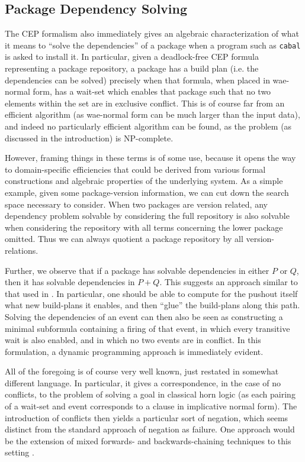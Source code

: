 \documentclass[hoptionsi,review,screen,format=sigconf]{acmart}
\theoremstyle{definition}
\begin{document}
\subsection{Package Dependency Solving}

The CEP formalism also immediately gives an algebraic characterization of what it means to ``solve the dependencies'' of a package when a program such as \texttt{cabal} is asked to install it. In particular, given a deadlock-free CEP formula representing a package repository, a package has a build plan (i.e. the dependencies can be solved) precisely when that formula, when placed in wae-normal form, has a wait-set which enables that package such that no two elements within the set are in exclusive conflict. This is of course far from an efficient algorithm (as wae-normal form can be much larger than the input data), and indeed no particularly efficient algorithm can be found, as the problem (as discussed in the introduction) is NP-complete. 

However, framing things in these terms is of some use, because it opens the way to domain-specific efficiencies that could be derived from various formal constructions and algebraic properties of the underlying system. As a simple example, given some package-version information, we can cut down the search space necessary to consider. When two packages are version related, any dependency problem solvable by considering the full repository is also solvable when considering the repository with all terms concerning the lower package omitted. Thus we can always quotient a package repository by all version-relations. 

Further, we observe that if a package has solvable dependencies in either \(P\) or \(Q\), then it has solvable dependencies in \(P + Q\). This suggests an approach similar to that used in \cite{master2020open}. In particular, one should be able to compute for the pushout itself what new build-plans it enables, and then ``glue'' the build-plans along  this path. Solving the dependencies of an event can then also be seen as constructing a minimal subformula containing a firing of that event, in which every transitive wait is also enabled, and in which no two events are in conflict. In this formulation, a dynamic programming approach is immediately evident.

All of the foregoing is of course very well known, just restated in somewhat different language. In particular, it gives a correspondence, in the case of no conflicts, to the problem of solving a goal in classical horn logic (as each pairing of a wait-set and event corresponds to a clause in implicative normal form). The introduction of conflicts then yields a particular sort of negation, which seems distinct from the standard approach of negation as failure. One approach would be the extension of mixed forwards- and backwards-chaining techniques to this setting \cite{harland2000forward}. 
\end{document}
